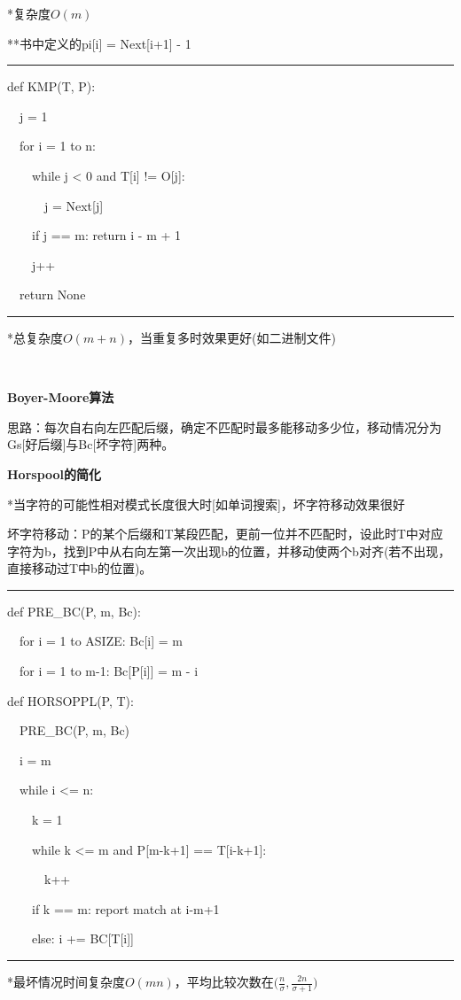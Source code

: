 \documentclass[a4paper,UTF8,fontset=windows]{ctexart}
\newenvironment{code}{\rule{36em}{0.1em}\setlength{\parindent}{1em}

}{

\setlength{\parindent}{0em}\rule{36em}{0.1em}}
\begin{document}
*\hspace{0em}复杂度$O(m)$

**\hspace{0em}书中定义的pi[i] = Next[i+1] - 1

\begin{code}
def KMP(T, P):

\ \ j = 1

\ \ for i = 1 to n:

\ \ \ \ while j < 0 and T[i] != O[j]:

\ \ \ \ \ \ j = Next[j]

\ \ \ \ if j == m: return i - m + 1

\ \ \ \ j++

\ \ return None
\end{code}

*\hspace{0em}总复杂度$O(m+n)$，当重复多时效果更好(如二进制文件)

\

\textbf{Boyer-Moore算法}

思路：每次自右向左匹配后缀，确定不匹配时最多能移动多少位，移动情况分为Gs[好后缀]与Bc[坏字符]两种。

\textbf{Horspool的简化}

*\hspace{0em}当字符的可能性相对模式长度很大时[如单词搜索]，坏字符移动效果很好

坏字符移动：P的某个后缀和T某段匹配，更前一位并不匹配时，设此时T中对应字符为b，找到P中从右向左第一次出现b的位置，并移动使两个b对齐(若不出现，直接移动过T中b的位置)。

\begin{code}
def PRE\_BC(P, m, Bc):

\ \ for i = 1 to ASIZE: Bc[i] = m

\ \ for i = 1 to m-1: Bc[P[i]] = m - i

def HORSOPPL(P, T):

\ \ PRE\_BC(P, m, Bc)

\ \ i = m

\ \ while i <= n:

\ \ \ \ k = 1

\ \ \ \ while k <= m and P[m-k+1] == T[i-k+1]:

\ \ \ \ \ \ k++

\ \ \ \ if k == m: report match at i-m+1

\ \ \ \ else: i += BC[T[i]]
\end{code}

*\hspace{0em}最坏情况时间复杂度$O(mn)$，平均比较次数在$\big(\frac{n}{\sigma},\frac{2n}{\sigma+1}\big)$
\end{document}
